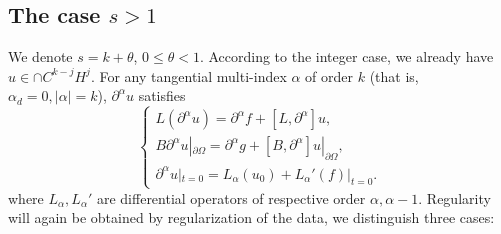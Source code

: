 \documentclass[AHL,Unicode,longabstracts,published]{cedram}
\begin{document}
\subsection{The case $s>1$}
We denote $s=k+\theta$, $0\leq \theta<1$. According to the integer case, we already have $u\in \cap C^{k-j}H^j$. For any tangential multi-index $\alpha$ of order $k$ (that is, $\alpha_d=0,|\alpha|=k$), $\partial^\alpha u$ satisfies
\begin{equation}\label{derBVP}
\left\{
\begin{array}{ll}
L(\partial^\alpha u)=\partial^\alpha f+[L,\partial^\alpha]u,\\
B\partial^\alpha u|_{\partial\Omega}=\partial^\alpha g+[B,\partial^\alpha]u|_{\partial\Omega},\\
\partial^\alpha u|_{t=0}=L_\alpha (u_0)+ L_\alpha' (f)|_{t=0}.
\end{array}
\right.
\end{equation}
where $L_\alpha,L_\alpha'$ are differential operators of respective order $\alpha,\alpha-1$. Regularity will again be obtained by regularization of the data, we distinguish three cases:
\end{document}
